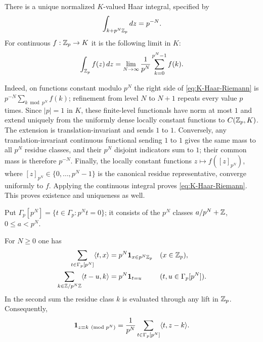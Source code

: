 There is a unique normalized $K$-valued Haar integral, specified by
\begin{equation}
\label{eq:K-Haar-ball}
 \int_{k+p^N\mathbb Z_p}dz=p^{-N}.
\end{equation}
For continuous $f:\mathbb Z_p\to K$ it is the following limit in $K$:
\begin{equation}
\label{eq:K-Haar-Riemann}
 \int_{\mathbb Z_p}f(z)\,dz
 =\lim_{N\to\infty}\frac1{p^N}\sum_{k=0}^{p^N-1}f(k).
\end{equation}

Indeed, on functions constant modulo $p^N$ the right side of
\cref{eq:K-Haar-Riemann} is $p^{-N}\sum_{k\bmod p^N}f(k)$; refinement from
level $N$ to $N+1$ repeats every value $p$ times.  Since $|p|=1$ in $K$,
these finite-level functionals have norm at most $1$ and extend uniquely from
the uniformly dense locally constant functions to $C(\mathbb Z_p,K)$.  The
extension is translation-invariant and sends $1$ to $1$.  Conversely, any
translation-invariant continuous functional sending $1$ to $1$ gives the
same mass to all $p^N$ residue classes, and their $p^N$ disjoint indicators
sum to $1$; their common mass is therefore $p^{-N}$.  Finally, the locally
constant functions $z\mapsto f([z]_{p^N})$, where
$[z]_{p^N}\in\{0,\ldots,p^N-1\}$ is the canonical residue representative,
converge uniformly to $f$.  Applying the continuous integral proves
\cref{eq:K-Haar-Riemann}.  This proves existence and uniqueness as well.

Put $\Gamma_p[p^N]=\{t\in\Gamma_p:p^Nt=0\}$; it consists of the $p^N$
classes $a/p^N+\mathbb Z$, $0\leq a<p^N$.

\begin{proposition}
\label{prop:finite-character-orthogonality}
For $N\geq0$ one has
\begin{align}
 \sum_{t\in\Gamma_p[p^N]}\langle t,x\rangle
 &=p^N\mathbf 1_{x\in p^N\mathbb Z_p}
 &&(x\in\mathbb Z_p),\label{eq:finite-orthogonality-primal}\\
 \sum_{k\in\mathbb Z/p^N\mathbb Z}\langle t-u,k\rangle
 &=p^N\mathbf 1_{t=u}
 &&(t,u\in\Gamma_p[p^N]).\label{eq:finite-orthogonality-dual}
\end{align}
In the second sum the residue class $k$ is evaluated through any lift in
$\mathbb Z_p$.
Consequently,
\begin{equation}
\label{eq:finite-character-indicator}
 \mathbf 1_{z\equiv k\pmod{p^N}}
 =\frac1{p^N}\sum_{t\in\Gamma_p[p^N]}
   \langle t,z-k\rangle.
\end{equation}
\end{proposition}

